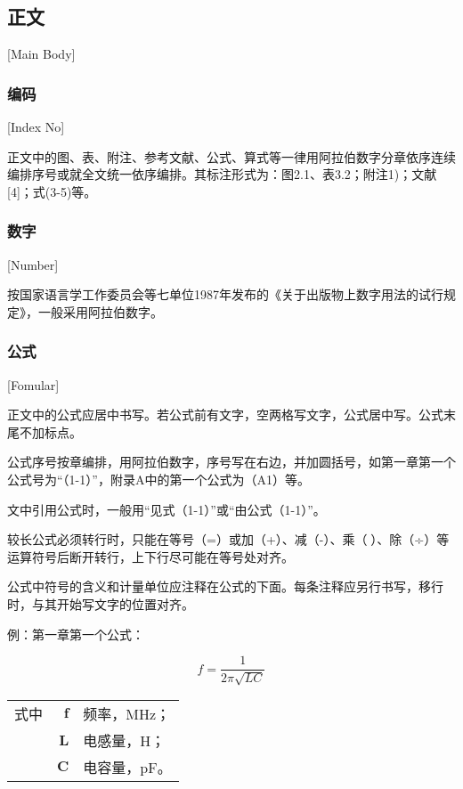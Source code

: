 \subsection{正文}[Main Body]


\subsubsection{编码}[Index No]

正文中的图、表、附注、参考文献、公式、算式等一律用阿拉伯数字分章依序连续编排序号或就全文统一依序编排。其标注形式为：图2.1、表3.2；附注1)；文献[4]；式(3-5)等。

\subsubsection{数字}[Number]

按国家语言学工作委员会等七单位1987年发布的《关于出版物上数字用法的试行规定》，一般采用阿拉伯数字。

\subsubsection{公式}[Fomular]

正文中的公式应居中书写。若公式前有文字，空两格写文字，公式居中写。公式末尾不加标点。

公式序号按章编排，用阿拉伯数字，序号写在右边，并加圆括号，如第一章第一个公式号为“（1-1）”，附录A中的第一个公式为（A1）等。

文中引用公式时，一般用“见式（1-1）”或“由公式（1-1）”。

较长公式必须转行时，只能在等号（=）或加（+）、减（-）、乘（）、除（÷）等运算符号后断开转行，上下行尽可能在等号处对齐。

公式中符号的含义和计量单位应注释在公式的下面。每条注释应另行书写，移行时，与其开始写文字的位置对齐。

例：第一章第一个公式：

\begin{equation}\label{form2x1}
  f=\frac{1}{2\pi\sqrt{LC}}
\end{equation}

\begin{tabularx}{\textwidth}{@{}l@{\quad}r@{——}X@{}}
  式中 & $\boldsymbol{f}$ & 频率，MHz；  \\
       & $\boldsymbol{L}$ & 电感量，H；  \\
       & $\mathbf{C}$     & 电容量，pF。
\end{tabularx}\vspace{3.15bp}

